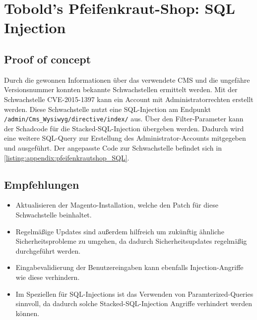 
\section{\makecvssbadge Tobold's Pfeifenkraut-Shop: SQL Injection}

\subsection*{Proof of concept}
Durch die gewonnen Informationen über das verwendete CMS und die ungefähre Versionsnummer konnten bekannte Schwachstellen ermittelt werden. Mit der Schwachstelle CVE-2015-1397 kann ein Account mit Administratorrechten erstellt werden. Diese Schwachstelle nutzt eine SQL-Injection am Endpunkt \texttt{/admin/Cms\_Wysiwyg/directive/index/} aus. Über den Filter-Parameter kann der Schadcode für die Stacked-SQL-Injection übergeben werden. Dadurch wird eine weitere SQL-Query zur Erstellung des Administrator-Accounts mitgegeben und ausgeführt. Der angepasste Code zur Schwachstelle befindet sich in \autoref{listing:appendix:pfeifenkrautshop_SQL}.


\subsection*{Empfehlungen}
\begin{itemize}
    \item Aktualisieren der Magento-Installation, welche den Patch für diese Schwachstelle beinhaltet.
    \item Regelmäßige Updates sind außerdem hilfreich um zukünftig ähnliche Sicherheitsprobleme zu umgehen, da dadurch Sicherheitsupdates regelmäßig durchgeführt werden.
    \item Eingabevalidierung der Benutzereingaben kann ebenfalls Injection-Angriffe wie diese verhindern.
    \item Im Speziellen für SQL-Injections ist das Verwenden von Paramterized-Queries sinnvoll, da dadurch solche Stacked-SQL-Injection Angriffe verhindert werden können.
\end{itemize}


